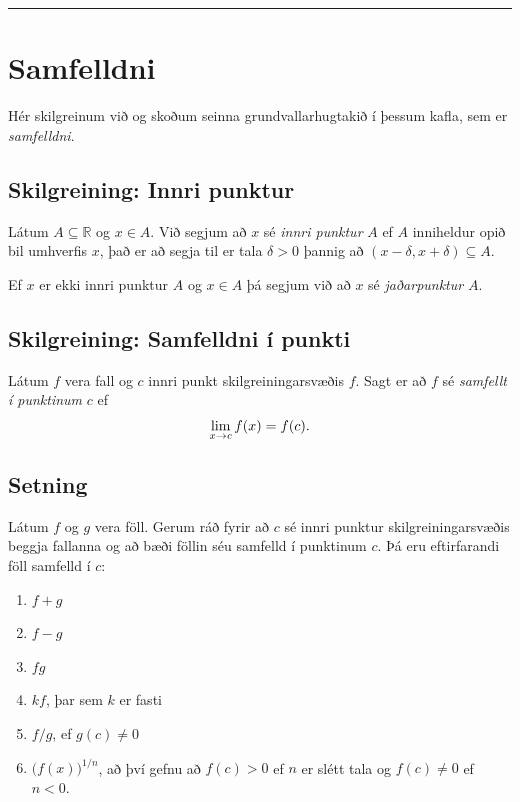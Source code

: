 \documentclass[a4paper,10pt,icelandic]{sphinxmanual}
\begin{document}

\bigskip\hrule{}\bigskip



\section{Samfelldni}
\label{kafli02:samfelldni}\label{kafli02:id11}
Hér skilgreinum við og skoðum seinna grundvallarhugtakið í þessum kafla, sem er \textit{samfelldni}.


\subsection{Skilgreining: Innri punktur}
\label{kafli02:skilgreining-innri-punktur}\label{kafli02:index-7}
Látum \(A\subseteq {{\mathbb  R}}\) og \(x\in A\). Við segjum að
\(x\) sé \textit{innri punktur} \(A\) ef \(A\) inniheldur opið bil
umhverfis \(x\), það er að segja til er tala \(\delta>0\) þannig
að \((x-\delta, x+\delta)\subseteq
A\).

Ef \(x\) er ekki innri punktur \(A\) og \(x\in A\) þá segjum
við að \(x\) sé \textit{jaðarpunktur} \(A\).


\subsection{Skilgreining: Samfelldni í punkti}
\label{kafli02:index-8}\label{kafli02:skilgreining-samfelldni-i-punkti}
Látum \(f\) vera fall og \(c\) innri punkt skilgreiningarsvæðis
\(f\). Sagt er að \(f\) sé \emph{samfellt í punktinum} \(c\) ef
\begin{gather}
\begin{split}\lim_{x\rightarrow c}f(x)=f(c).\end{split}\notag
\end{gather}

\subsection{Setning}
\label{kafli02:id12}
Látum \(f\) og \(g\) vera föll. Gerum ráð fyrir að \(c\) sé
innri punktur skilgreiningarsvæðis beggja fallanna og að bæði föllin séu
samfelld í punktinum \(c\). Þá eru eftirfarandi föll samfelld í
\(c\):
\begin{enumerate}
\item {} 
\(f+g\)

\item {} 
\(f-g\)

\item {} 
\(fg\)

\item {} 
\(kf\), þar sem \(k\) er fasti

\item {} 
\(f/g\), ef \(g(c)\neq 0\)

\item {} 
\(\Big(f(x)\Big)^{1/n}\), að því gefnu að \(f(c)>0\) ef
\(n\) er slétt tala og \(f(c)\neq 0\) ef \(n<0\).

\end{enumerate}
\end{document}
